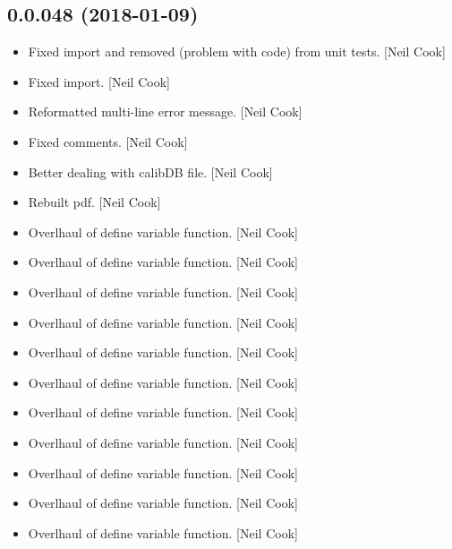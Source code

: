 \documentclass[a4paper,10pt,english]{report}
\begin{document}
\subsection{0.0.048 (2018-01-09)}
\label{\detokenize{misc/changelog:id504}}\begin{itemize}
\item {} 
Fixed import and removed  (problem with code) from unit tests.
{[}Neil Cook{]}

\item {} 
Fixed import. {[}Neil Cook{]}

\item {} 
Reformatted multi-line error message. {[}Neil Cook{]}

\item {} 
Fixed comments. {[}Neil Cook{]}

\item {} 
Better dealing with calibDB file. {[}Neil Cook{]}

\item {} 
Rebuilt pdf. {[}Neil Cook{]}

\item {} 
Overlhaul of define variable function. {[}Neil Cook{]}

\item {} 
Overlhaul of define variable function. {[}Neil Cook{]}

\item {} 
Overlhaul of define variable function. {[}Neil Cook{]}

\item {} 
Overlhaul of define variable function. {[}Neil Cook{]}

\item {} 
Overlhaul of define variable function. {[}Neil Cook{]}

\item {} 
Overlhaul of define variable function. {[}Neil Cook{]}

\item {} 
Overlhaul of define variable function. {[}Neil Cook{]}

\item {} 
Overlhaul of define variable function. {[}Neil Cook{]}

\item {} 
Overlhaul of define variable function. {[}Neil Cook{]}

\item {} 
Overlhaul of define variable function. {[}Neil Cook{]}

\item {} 
Overlhaul of define variable function. {[}Neil Cook{]}


\end{itemize}
\end{document}
